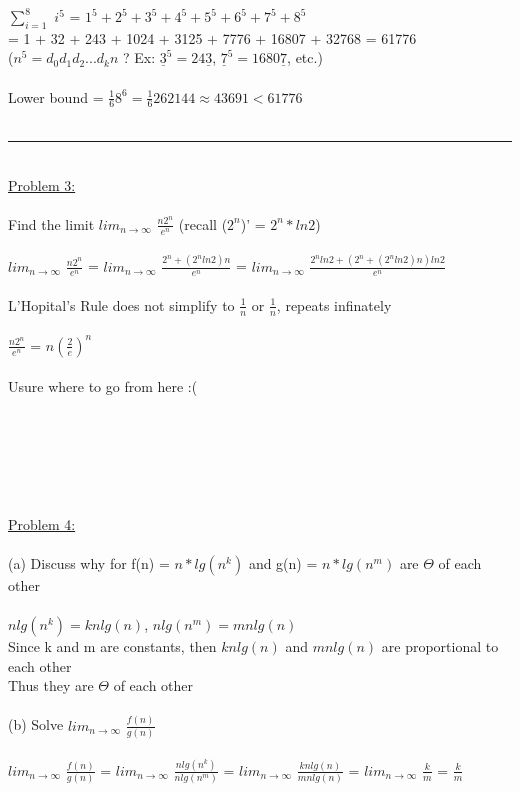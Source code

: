 \documentclass{article}
\begin{document}
    \indent $\sum_{i=1}^8$ $i^5$ = $1^5 + 2^5 + 3^5 + 4^5 + 5^5 + 6^5 + 7^5 + 8^5$\\
    \indent\hspace{1.36cm}= 1 + 32 + 243 + 1024 + 3125 + 7776 + 16807 + 32768 = 61776\\
    \indent\hspace{1.36cm}($n^5 = d_0d_1d_2...d_kn$ ? Ex: $\underline{3}^5 = 24\underline{3}$, $\underline{7}^5 = 1680\underline{7}$, etc.)\\\\
    \indent Lower bound = $\frac{1}{6}8^6 = \frac{1}{6}262144 \approx 43691 < 61776$\\
    \\
    \rule{\textwidth}{0.5pt}\\
    \underline{Problem 3:}\\\\
    Find the limit $lim_{n\rightarrow\infty}$ $\frac{n2^n}{e^n}$ (recall ($2^n$)' = $2^n*ln2$)\\
    \\
    \indent $lim_{n\rightarrow\infty}$ $\frac{n2^n}{e^n}$ = $lim_{n\rightarrow\infty}$ $\frac{2^n + (2^nln2)n}{e^n}$ = $lim_{n\rightarrow\infty}$ $\frac{2^nln2 + (2^n + (2^nln2)n)ln2}{e^n}$\\\\
    \indent L'Hopital's Rule does not simplify to $\frac{1}{n}$ or $\frac{1}{n}$, repeats infinately\\\\
    \indent $\frac{n2^n}{e^n}$ = $n(\frac{2}{e})^n$ \\\\
    \indent Usure where to go from here :(\\\\\\\\\\\\
    \\
    \underline{Problem 4:}\\\\
    (a) Discuss why for f(n) = $n*lg(n^k)$ and g(n) = $n*lg(n^m)$ are $\Theta$ of each other\\
    \\
    \indent $nlg(n^k) = knlg(n)$, $nlg(n^m) = mnlg(n)$\\
    \indent Since k and m are constants, then $knlg(n)$ and $mnlg(n)$ are proportional to each other\\
    \indent Thus they are $\Theta$ of each other\\
    \\
    (b) Solve $lim_{n\rightarrow\infty}$ $\frac{f(n)}{g(n)}$\\
    \\
    \indent $lim_{n\rightarrow\infty}$ $\frac{f(n)}{g(n)}$ = $lim_{n\rightarrow\infty}$ $\frac{nlg(n^k)}{nlg(n^m)}$ = $lim_{n\rightarrow\infty}$ $\frac{knlg(n)}{mnlg(n)}$ = $lim_{n\rightarrow\infty}$ $\frac{k}{m}$ = $\frac{k}{m}$\\
    \\
\end{document}
